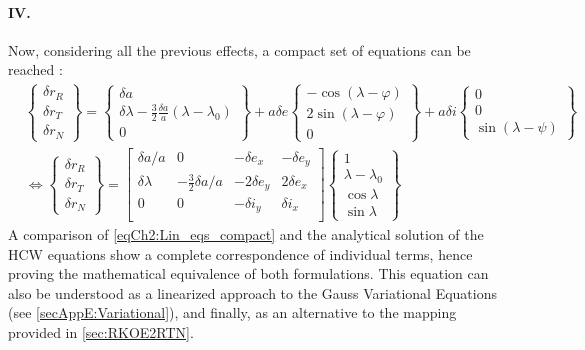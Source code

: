 			\paragraph{\textcolor{GMVred}{IV.}  \\}
			\indent Now, considering all the previous effects, a compact set of equations can be reached \cite{Montenbruck_DAmico}:
			\begin{align}
			&\label{eqCh2:Lin_eqs_full} \left\{ \begin{array}{c}
			\delta r_R\\
			\delta r_T\\
			\delta r_N
			\end{array}\right\}
			 = 
			\left\{ \begin{array}{c}
			\delta a\\
			\delta \lambda - \frac{3}{2}\frac{\delta a}{a} (\lambda - \lambda_0) \\
			0
			\end{array}\right\}
			+
			a\delta e \left\{ \begin{array}{c}
			-\cos(\lambda - \varphi)\\
			2\sin (\lambda - \varphi) \\
			0
			\end{array}\right\}
			+
			a\delta i \left\{ \begin{array}{c}
			0 \\
			0 \\
			\sin (\lambda - \psi)
			\end{array}\right\}
			\\
			&\Longleftrightarrow\label{eqCh2:Lin_eqs_compact} \left\{ \begin{array}{c}
			\delta r_R\\
			\delta r_T\\
			\delta r_N
			\end{array}\right\} 
			= 
			\left[\begin{array}{cccc}
			\delta a / a 	& 0 						& -\delta e_x 	& -\delta e_y \\
			\delta \lambda 	& -\frac{3}{2} \delta a / a & -2\delta e_y 	& 2\delta e_x \\
			0				& 0 						& -\delta i_y 	& \delta i_x \\
			\end{array}\right]
			\left\{ \begin{array}{c}
			1\\
			\lambda - \lambda_0\\
			\cos\lambda \\
			\sin \lambda
			\end{array}\right\} 
			\end{align}
			\indent A comparison of \ref{eqCh2:Lin_eqs_compact} and the analytical solution of the HCW equations show a complete correspondence of individual terms, hence proving the mathematical equivalence of both formulations. This equation can also be understood as a linearized approach to the Gauss Variational Equations (see \ref{secAppE:Variational}), and finally, as an alternative to the mapping provided in \ref{sec:RKOE2RTN}.
